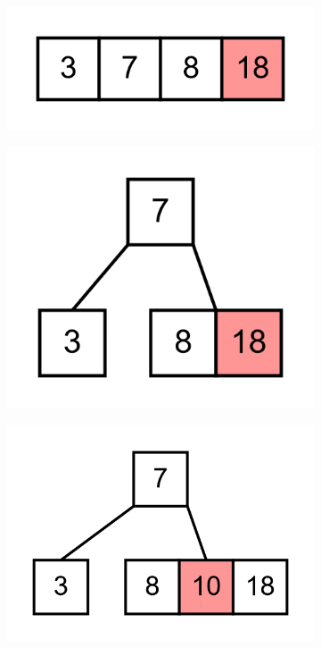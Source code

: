 \documentclass[11pt,a4paper]{article}
\begin{document}
\begin{loesung}
\begin{enumerate}
\begin{figure}[h!]
\begin{subfigure}[b]{0.31\textwidth}
                \centering
                \includegraphics[scale=0.15]{img/3d/4}
            \end{subfigure}
            \begin{subfigure}[b]{0.31\textwidth}
                \centering
                \includegraphics[scale=0.15]{img/3d/5}
            \end{subfigure}
            \begin{subfigure}[b]{0.31\textwidth}
                \centering
                \includegraphics[scale=0.15]{img/3d/6}

\end{subfigure}
\end{figure}
\end{enumerate}
\end{loesung}
\end{document}
